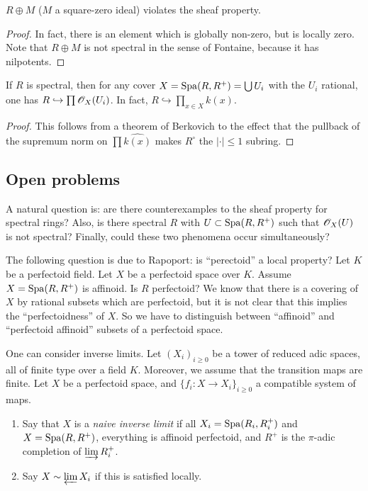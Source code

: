 \begin{theorem}
$R\oplus M$ ($M$ a square-zero ideal) violates the sheaf property. 
\end{theorem}
\begin{proof}In fact, there is an element which is globally non-zero, but is locally 
zero. Note that $R\oplus M$ is not spectral in the sense of Fontaine, because it 
has nilpotents. 
\end{proof}

\begin{proposition}
If $R$ is spectral, then for any cover $X=\operatorname{Spa}(R,R^+) = \bigcup U_i$ with the 
$U_i$ rational, one has 
$R\hookrightarrow \prod\mathscr{O}_X(U_i)$. In fact, 
$R\hookrightarrow \prod_{x\in X} \widehat{k(x)}$. 
\end{proposition}
\begin{proof}
This follows from a theorem of Berkovich to the effect that the pullback of the 
supremum norm on $\prod \widehat{k(x)}$ makes $R^\circ$ the $|\cdot|\leqslant 1$ 
subring. 
\end{proof}





\subsection{Open problems}

A natural question is: are there counterexamples to the sheaf property for 
spectral rings? Also, is there spectral $R$ with $U\subset \operatorname{Spa}(R,R^+)$ such that 
$\mathscr{O}_X(U)$ is not spectral? Finally, could these two phenomena occur simultaneously?

The following question is due to Rapoport: is ``perectoid'' a local property? Let 
$K$ be a perfectoid field. Let $X$ be a perfectoid space over $K$. Assume 
$X=\operatorname{Spa}(R,R^+)$ is affinoid. Is $R$ perfectoid? We know that there is a covering 
of $X$ by rational subsets which are perfectoid, but it is not clear that this 
implies the ``perfectoidness'' of $X$. So we have to distinguish between 
``affinoid'' and ``perfectoid affinoid'' subsets of a perfectoid space. 

One can consider inverse limits. Let $(X_i)_{i\geqslant 0}$ be a 
tower of reduced adic spaces, all of finite type over a field $K$. Moreover, we 
assume that the transition maps are finite. Let $X$ be a perfectoid space, and 
$\{f_i:X\to X_i\}_{i\geqslant 0}$ a compatible system of maps. 

\begin{definition}
\begin{enumerate}
  \item Say that $X$ is a \emph{naive inverse limit} if all $X_i=\operatorname{Spa}(R_i,R_i^+)$ 
    and $X=\operatorname{Spa}(R,R^+)$, everything is affinoid perfectoid, and 
    $R^+$ is the $\pi$-adic completion of $\varinjlim R_i^+$. 
  \item Say $X\sim \varprojlim X_i$ if this is satisfied locally. 
\end{enumerate}
\end{definition}


